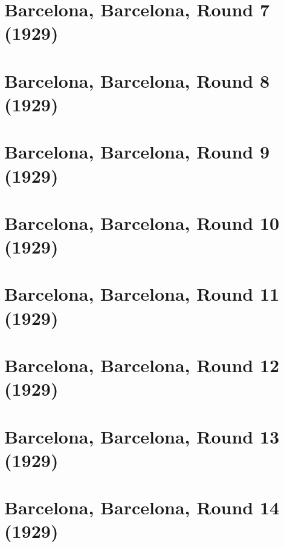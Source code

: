 \documentclass[11pt]{article}
\begin{document}
\clearpage

\section{Barcelona, Barcelona, Round 7 (1929)}


\clearpage

\section{Barcelona, Barcelona, Round 8 (1929)}


\clearpage

\section{Barcelona, Barcelona, Round 9 (1929)}


\clearpage

\section{Barcelona, Barcelona, Round 10 (1929)}


\clearpage

\section{Barcelona, Barcelona, Round 11 (1929)}


\clearpage

\section{Barcelona, Barcelona, Round 12 (1929)}


\clearpage

\section{Barcelona, Barcelona, Round 13 (1929)}


\clearpage

\section{Barcelona, Barcelona, Round 14 (1929)}


\clearpage
\end{document}
